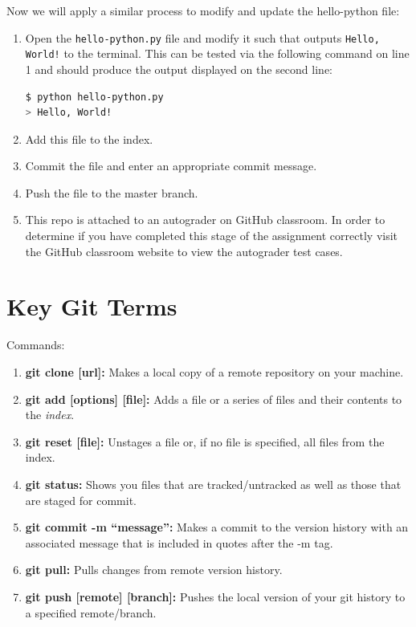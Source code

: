 \documentclass[a4paper,10pt]{article} %
\begin{document}
Now we will apply a similar process to modify and update the hello-python file:
\begin{enumerate}
  \item Open the \lstinline|hello-python.py| file and modify it such that outputs \lstinline|Hello, World!| to the terminal. This can be tested via the following command on line 1 and should produce the output displayed on the second line:
\begin{lstlisting}[language=bash]
$ python hello-python.py
> Hello, World!
\end{lstlisting}
  \item Add this file to the index.
  \item Commit the file and enter an appropriate commit message.
  \item Push the file to the master branch.
  \item This repo is attached to an autograder on GitHub classroom. In order to determine if you have completed this stage of the assignment correctly visit the GitHub classroom website to view the autograder test cases.
\end{enumerate}


\newpage
\section{Key Git Terms}

Commands:
\begin{enumerate}
  \item \textbf{git clone [url]:} Makes a local copy of a remote repository on your machine.
  \item \textbf{git add [options] [file]:} Adds a file or a series of files and their contents to the \textit{index}.
  \item \textbf{git reset [file]: } Unstages a file or, if no file is specified, all files from the index.
  \item \textbf{git status: } Shows you files that are tracked/untracked as well as those that are staged for commit.
  \item \textbf{git commit -m ``message'': } Makes a commit to the version history with an associated message that is included in quotes after the -m tag.
  \item \textbf{git pull: } Pulls changes from remote version history.
  \item \textbf{git push [remote] [branch]: } Pushes the local version of your git history to a specified remote/branch.
\end{enumerate}
\end{document}
